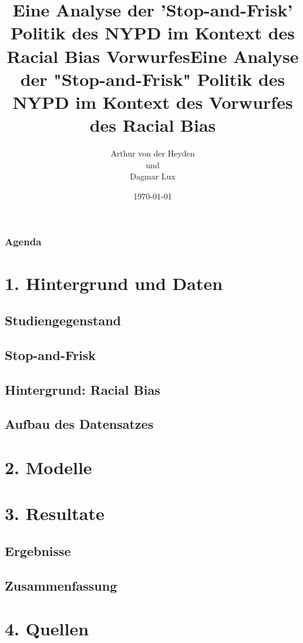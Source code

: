 \documentclass{beamer}
\title{Eine Analyse der 'Stop-and-Frisk' Politik des NYPD im Kontext des Racial Bias Vorwurfes}
\author{Arthur von der Heyden \\ und \\ Dagmar Lux}
\date{\today}
\begin{document}
	\begin{frame}
		\titlepage
		\title{Eine Analyse der "Stop-and-Frisk" Politik des NYPD im Kontext des Vorwurfes des Racial Bias}
	\end{frame}
	\begin{frame}
		\frametitle{Agenda}
		\tableofcontents[hideallsubsections]
	\end{frame}
	\section {1. Hintergrund und Daten}
		\subsection{Studiengegenstand}
		\subsection{Stop-and-Frisk}
		\subsection{Hintergrund: Racial Bias}
		\subsection{Aufbau des Datensatzes}
	\section{2. Modelle}
	\section{3. Resultate}
		\subsection{Ergebnisse}
		\subsection{Zusammenfassung}
	\section{4. Quellen}
\end{document}
